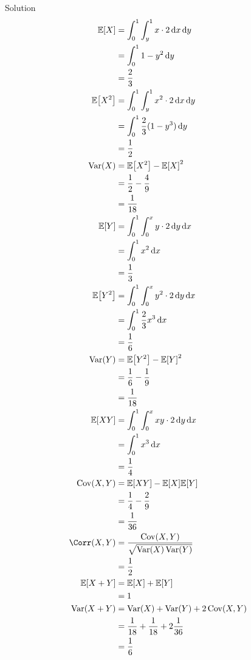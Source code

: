 \documentclass{article}
\begin{document}
\begin{solution}
    {Solution}
    \begin{align*}
        \E{X}
        &= \int_{0}^{1}\int_{y}^{1}x\cdot 2\diff x \diff y \\
        &= \int_{0}^{1}1-y^2\diff y \\
        &= \frac{2}{3} \\
        \E{X^2}
        &= \int_{0}^{1}\int_{y}^{1}x^2\cdot 2\diff x \diff y \\
        &= \int_{0}^{1}\frac{2}{3}(1-y^3)\diff y \\
        &= \frac{1}{2} \\
        \Var(X)
        &= \E{X^2}-\E{X}^2 \\
        &= \frac{1}{2}-\frac{4}{9} \\
        &= \frac{1}{18} \\
        \E{Y}
        &= \int_{0}^{1}\int_{0}^{x}y\cdot 2\diff y \diff x \\
        &= \int_{0}^{1}x^2\diff x \\
        &= \frac{1}{3} \\
        \E{Y^2}
        &= \int_{0}^{1}\int_{0}^{x}y^2\cdot 2\diff y \diff x \\
        &= \int_{0}^{1}\frac{2}{3}x^3\diff x \\
        &= \frac{1}{6} \\
        \Var(Y)
        &= \E{Y^2}-\E{Y}^2 \\
        &= \frac{1}{6}-\frac{1}{9} \\
        &= \frac{1}{18} \\
        \E{XY}
        &= \int_{0}^{1}\int_{0}^{x}xy\cdot 2\diff y \diff x \\
        &= \int_{0}^{1}x^3\diff x \\
        &= \frac{1}{4} \\
        \Cov(X,Y)
        &= \E{XY}-\E{X}\E{Y} \\
        &= \frac{1}{4}-\frac{2}{9} \\
        &= \frac{1}{36} \\
        \Corr(X,Y)
        &= \frac{\Cov(X,Y)}{\sqrt{\Var(X)\Var(Y)}} \\
        &= \frac{1}{2} \\
        \E{X+Y}
        &= \E{X}+\E{Y} \\
        &= 1 \\
        \Var(X+Y)
        &= \Var(X)+\Var(Y)+2\Cov(X,Y) \\
        &= \frac{1}{18}+\frac{1}{18}+2\frac{1}{36} \\
        &= \frac{1}{6}
    \end{align*}
\end{solution}
\end{document}
